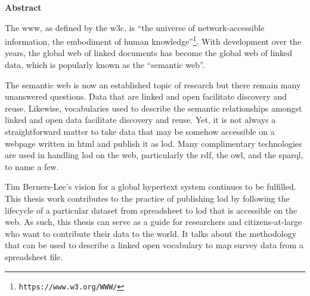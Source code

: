 
\begin{doublespace}
\begin{center}
\textbf{Abstract}
\end{center}

The \ac*{www}, 
as defined by the \ac*{w3c}, 
is ``the universe of network-accessible information, 
the embodiment of human knowledge''\footnote{\tt https://www.w3.org/WWW/}. 
With development over the years, 
the global web of linked documents has become the global web of linked data, 
which is popularly known as the ``semantic web''.

The semantic web is now an established topic of research 
but there remain many unanswered questions. 
Data that are linked and open facilitate discovery and reuse. 
Likewise, vocabularies used to describe the semantic relationships amongst 
linked and open data facilitate discovery and reuse. 
Yet, it is not always a straightforward matter to take data 
that may be somehow accessible on a webpage written in \ac*{html} 
and publish it as \ac*{lod}. 
Many complimentary technologies are used in handling \ac*{lod} 
on the web, 
particularly the \ac*{rdf}, 
the \ac*{owl}, 
and the \ac*{sparql},
to name a few. 

Tim Berners-Lee's vision for a global hypertext system continues to be fulfilled. 
This thesis work contributes to the practice of publishing \ac*{lod} by following 
the lifecycle of a particular dataset from spreadsheet to \ac*{lod} that is 
accessible on the web. 
As such, this thesis can serve as a guide for researchers
and citizens-at-large who want to contribute their data to the world. 
It talks about the methodology 
that can be used to describe a linked open vocabulary 
to map survey data from a spreadsheet file.

\end{doublespace}